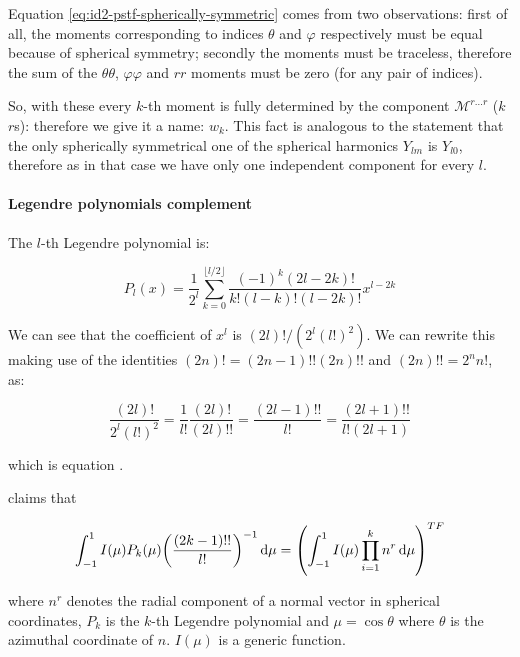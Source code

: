 \documentclass[main.tex]{subfiles}
\begin{document}
Equation \eqref{eq:id2-pstf-spherically-symmetric} comes from two observations:
first of all, the moments corresponding to indices \(\theta\) and \(\varphi\) respectively must be equal because of spherical symmetry; secondly the moments must be traceless, therefore the sum of the \(\theta \theta\), \(\varphi \varphi\) and \(rr\) moments must be zero (for any pair of indices).

So, with these every \(k\)-th moment is fully determined by the component \(\mathscr M ^{r\dots r}\) (\(k\) \(r\)s): therefore we give it a name: \(w_k\).
This fact is analogous to the statement that the only spherically symmetrical one of the spherical harmonics \(Y_{lm}\) is \(Y_{l0}\), therefore as in that case we have only one independent component for every \(l\).

\paragraph{Legendre polynomials complement}

The \(l\)-th Legendre polynomial is:

\begin{equation} \label{eq:legendre-polynomials}
    P_{l}(x)=\frac{1}{2^{l}} \sum_{k=0}^{\lfloor l / 2\rfloor} \frac{(-1)^{k}(2 l-2 k) !}{k !(l-k) !(l-2 k) !} x^{l-2 k}
\end{equation}

We can see that the coefficient of \(x^l\) is \((2l)! / (2^l (l!)^2)\). We can rewrite this making use of the identities \((2n)! = (2n-1)!! (2n)!!\) and \((2n)!! = 2^n n!\),  as:

\begin{equation}
    \frac{(2l)!}{2^l (l!)^2} = \frac{1}{l!} \frac{(2l)!}{(2l)!!} = \frac{(2l-1)!!}{l!} = \frac{(2l+1)!!}{l! (2l+1)}
\end{equation}

which is equation \cite[eq. 5.7d]{Thorne:1981feb}.

\textcite[eqs. 5.6]{Thorne:1981feb} claims that

\begin{equation} \label{eq:thorne-trace-free-integral-claim}
    \int_{-1}^1 I(\mu) P_k(\mu) \qty(\frac{(2k-1)!!}{l!})^{-1} \dd{\mu} = \qty(\int_{-1}^1  I(\mu) \prod_{i=1}^k n^r \dd{\mu})^{TF}
\end{equation}

where \(n^r\) denotes the radial component of a normal vector in spherical coordinates, \(P_k\) is the \(k\)-th Legendre polynomial and \(\mu = \cos \theta\) where \(\theta\) is the azimuthal coordinate of \(n\). \(I(\mu)\) is a generic function.
\end{document}

